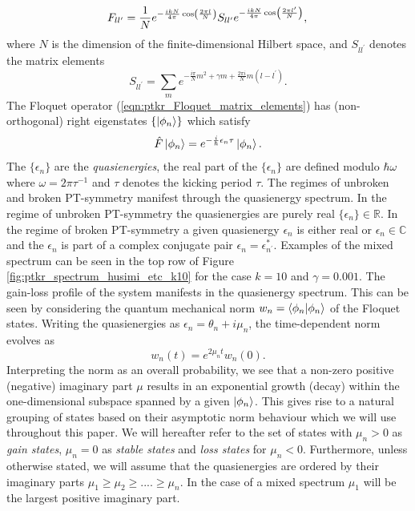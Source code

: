 \documentclass{iopart}
\begin{document}
	\begin{equation}
		\label{eqn:ptkr_Floquet_matrix_elements}
		F_{ll^{\prime}}=
		\frac{1}{N}e^{-\frac{ikN}{4\pi}\cos\left(\frac{2\pi l}{N}\right)}S_{ll^{\prime}}e^{-\frac{ikN}{4\pi}\cos\left(\frac{2\pi l^{\prime}}{N}\right)},\\
	\end{equation}
	where $N$ is the dimension of the finite-dimensional Hilbert space, and $S_{ll^{\prime}}$ denotes the matrix elements
	\begin{equation}
		S_{ll^{\prime}}=\sum_m e^{-\frac{i\pi}{N}m^2+\gamma m+\frac{2\pi i}{N}m(l-l^{\prime})}.
	\end{equation}
	The Floquet operator (\ref{eqn:ptkr_Floquet_matrix_elements}) has (non-orthogonal) right eigenstates $\lbrace\ket{\phi_n}\rbrace$ which satisfy  
	\begin{equation}
		\hat{F}\ket{\phi_n}=e^{-\frac{i}{\hbar}\epsilon_n\tau}\ket{\phi_n}.
	\end{equation}
	The $\lbrace\epsilon_n\rbrace$ are the \textit{quasienergies}, the real part of the $\lbrace\epsilon_n\rbrace$ are defined modulo $\hbar\omega$ where $\omega=2\pi\tau^{-1}$ and $\tau$ denotes the kicking period $\tau$. The regimes of unbroken and broken PT-symmetry manifest through the quasienergy spectrum. In the regime of unbroken PT-symmetry the quasienergies are purely real $\lbrace\epsilon_n\rbrace\in\mathbb{R}$. In the regime of broken PT-symmetry a given quasienergy $\epsilon_n$ is either real or $\epsilon_n\in\mathbb{C}$ and the $\epsilon_n$ is part of a complex conjugate pair $\epsilon_n=\epsilon_{n^{\prime}}^{*}$. Examples of the mixed spectrum can be seen in the top row of Figure \ref{fig:ptkr_spectrum_husimi_etc_k10} for the case $k=10$ and $\gamma=0.001$. The gain-loss profile of the system manifests in the quasienergy spectrum. This can be seen by considering the quantum mechanical norm $w_n=\braket{\phi_n | \phi_n}$ of the Floquet states. Writing the quasienergies as $\epsilon_n=\theta_n+i\mu_n$, the time-dependent norm evolves as 
	\begin{equation}
		\label{eqn:stationary_state_norm}
		w_n(t)=e^{2\mu_nt}w_n(0).
	\end{equation}
	Interpreting the norm as an overall probability, we see that a non-zero positive (negative) imaginary part $\mu$ results in an exponential growth (decay) within the one-dimensional subspace spanned by a given $\ket{\phi_n}$. This gives rise to a natural grouping of states based on their asymptotic norm behaviour which we will use throughout this paper. We will hereafter refer to the set of states with $\mu_n>0$ as \textit{gain states}, $\mu_n=0$ as \textit{stable states} and \textit{loss states} for $\mu_n<0$. Furthermore, unless otherwise stated, we will assume that the quasienergies are ordered by their imaginary parts 	$\mu_1\ge\mu_2\ge....\ge\mu_n$. In the case of a mixed spectrum $\mu_1$ will be the largest positive imaginary part. 
	
\end{document}
